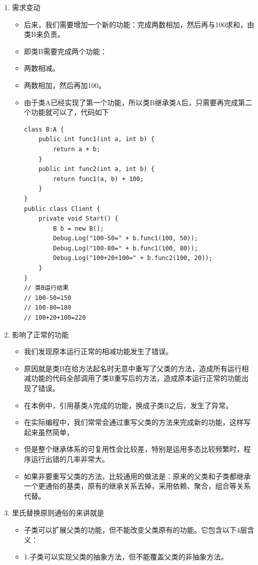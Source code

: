 \documentclass[9pt, b5paper]{article}
\begin{document}
\begin{enumerate}
\begin{itemize}
\end{itemize}
\item 需求变动
\label{sec:orga4402eb}
\begin{itemize}
\item 后来，我们需要增加一个新的功能：完成两数相加，然后再与100求和，由类B来负责。
\item 即类B需要完成两个功能：
\item 两数相减。
\item 两数相加，然后再加100。
\item 由于类A已经实现了第一个功能，所以类B继承类A后，只需要再完成第二个功能就可以了，代码如下 
\begin{verbatim}
class B:A {
    public int func1(int a, int b) {
        return a + b;
    }
    public int func2(int a, int b) {
        return func1(a, b) + 100;
    }
}
public class Client {
    private void Start() {
        B b = new B();
        Debug.Log("100-50=" + b.func1(100, 50));
        Debug.Log("100-80=" + b.func1(100, 80));
        Debug.Log("100+20+100=" + b.func2(100, 20));
    }
}
// 类B运行结果
// 100-50=150 
// 100-80=180 
// 100+20+100=220
\end{verbatim}
\end{itemize}
\item 影响了正常的功能
\label{sec:orgac29381}
\begin{itemize}
\item 我们发现原本运行正常的相减功能发生了错误。
\item 原因就是类B在给方法起名时无意中重写了父类的方法，造成所有运行相减功能的代码全部调用了类B重写后的方法，造成原本运行正常的功能出现了错误。
\item 在本例中，引用基类A完成的功能，换成子类B之后，发生了异常。
\item 在实际编程中，我们常常会通过重写父类的方法来完成新的功能，这样写起来虽然简单，
\item 但是整个继承体系的可复用性会比较差，特别是运用多态比较频繁时，程序运行出错的几率非常大。
\item 如果非要重写父类的方法，比较通用的做法是：原来的父类和子类都继承一个更通俗的基类，原有的继承关系去掉，采用依赖、聚合，组合等关系代替。
\end{itemize}
\item 里氏替换原则通俗的来讲就是
\label{sec:org6784a67}
\begin{itemize}
\item 子类可以扩展父类的功能，但不能改变父类原有的功能。它包含以下4层含义：
\item 1.子类可以实现父类的抽象方法，但不能覆盖父类的非抽象方法。

\end{itemize}
\end{enumerate}
\end{document}
